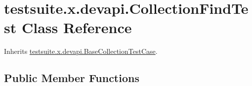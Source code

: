 \hypertarget{classtestsuite_1_1x_1_1devapi_1_1_collection_find_test}{}\section{testsuite.\+x.\+devapi.\+Collection\+Find\+Test Class Reference}
\label{classtestsuite_1_1x_1_1devapi_1_1_collection_find_test}


Inherits \mbox{\hyperlink{classtestsuite_1_1x_1_1devapi_1_1_base_collection_test_case}{testsuite.\+x.\+devapi.\+Base\+Collection\+Test\+Case}}.

\subsection*{Public Member Functions}
